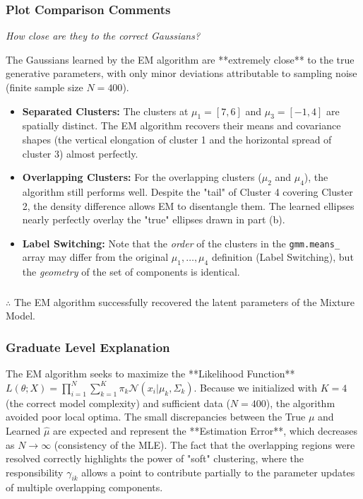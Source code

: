 \documentclass{article}
\begin{document}
\subsubsection*{Plot Comparison Comments}
\begin{flushleft}
    \textit{How close are they to the correct Gaussians?}
\end{flushleft}
The Gaussians learned by the EM algorithm are **extremely close** to the true generative parameters, with only minor deviations attributable to sampling noise (finite sample size $N=400$).

\begin{itemize}
    \item \textbf{Separated Clusters:} The clusters at $\mu_1=[7,6]$ and $\mu_3=[-1,4]$ are spatially distinct. The EM algorithm recovers their means and covariance shapes (the vertical elongation of cluster 1 and the horizontal spread of cluster 3) almost perfectly.
    \item \textbf{Overlapping Clusters:} For the overlapping clusters ($\mu_2$ and $\mu_4$), the algorithm still performs well. Despite the "tail" of Cluster 4 covering Cluster 2, the density difference allows EM to disentangle them. The learned ellipses nearly perfectly overlay the "true" ellipses drawn in part (b).
    \item \textbf{Label Switching:} Note that the \textit{order} of the clusters in the \texttt{gmm.means\_} array may differ from the original $\mu_1, \dots, \mu_4$ definition (Label Switching), but the \textit{geometry} of the set of components is identical.
\end{itemize}

\subsubsection*{\normalfont}{$\therefore$ }
The EM algorithm successfully recovered the latent parameters of the Mixture Model.

\subsubsection*{Graduate Level Explanation}
The EM algorithm seeks to maximize the **Likelihood Function** $L(\theta; X) = \prod_{i=1}^N \sum_{k=1}^K \pi_k \mathcal{N}(x_i | \mu_k, \Sigma_k)$. 
Because we initialized with $K=4$ (the correct model complexity) and sufficient data ($N=400$), the algorithm avoided poor local optima. The small discrepancies between the True $\mu$ and Learned $\hat{\mu}$ are expected and represent the **Estimation Error**, which decreases as $N \to \infty$ (consistency of the MLE). The fact that the overlapping regions were resolved correctly highlights the power of "soft" clustering, where the responsibility $\gamma_{ik}$ allows a point to contribute partially to the parameter updates of multiple overlapping components.
\end{document}
